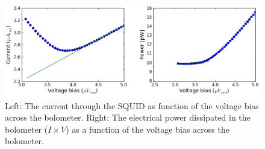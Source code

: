 \begin{figure}[htbp]
\begin{center}
\includegraphics[width=0.99\columnwidth]{figures/b53w0c0_IV.png} 
\caption{Left: The current through the \ac{SQUID} as function of the voltage bias across the bolometer. Right: The electrical power dissipated in the bolometer ($I \times V$) as a function of the voltage bias across the bolometer.
\label{fig:bolo_iv_curve} }
\end{center}
\end{figure}





